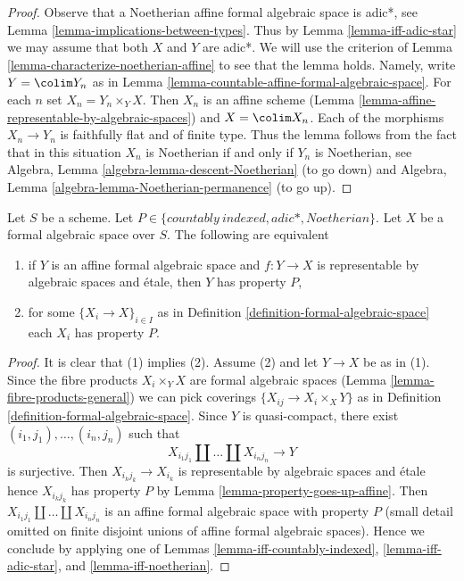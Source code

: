 \begin{proof}
Observe that a Noetherian affine formal algebraic space is adic*, see
Lemma \ref{lemma-implications-between-types}. Thus by
Lemma \ref{lemma-iff-adic-star} we may assume that both $X$ and $Y$
are adic*. We will use the criterion of
Lemma \ref{lemma-characterize-noetherian-affine}
to see that the lemma holds. Namely, write $Y = \colim Y_n$
as in Lemma \ref{lemma-countable-affine-formal-algebraic-space}.
For each $n$ set $X_n = Y_n \times_Y X$. Then $X_n$ is an
affine scheme (Lemma \ref{lemma-affine-representable-by-algebraic-spaces})
and $X = \colim X_n$. Each of the morphisms $X_n \to Y_n$ is
faithfully flat and of finite type. Thus the lemma follows from the
fact that in this situation $X_n$ is Noetherian if and only if $Y_n$
is Noetherian, see
Algebra, Lemma \ref{algebra-lemma-descent-Noetherian} (to go down)
and
Algebra, Lemma \ref{algebra-lemma-Noetherian-permanence} (to go up).
\end{proof}

\begin{lemma}
\label{lemma-type-local}
Let $S$ be a scheme. Let $P \in \{countably\ indexed, adic*, Noetherian\}$.
Let $X$ be a formal algebraic space over $S$.
The following are equivalent
\begin{enumerate}
\item if $Y$ is an affine formal algebraic space and
$f : Y \to X$ is representable by algebraic spaces and \'etale,
then $Y$ has property $P$,
\item for some $\{X_i \to X\}_{i \in I}$ as in
Definition \ref{definition-formal-algebraic-space}
each $X_i$ has property $P$.
\end{enumerate}
\end{lemma}

\begin{proof}
It is clear that (1) implies (2). Assume (2) and let
$Y \to X$ be as in (1). Since the fibre products $X_i \times_Y X$
are formal algebraic spaces (Lemma \ref{lemma-fibre-products-general})
we can pick coverings $\{X_{ij} \to X_i \times_X Y\}$ as in
Definition \ref{definition-formal-algebraic-space}.
Since $Y$ is quasi-compact, there exist
$(i_1, j_1), \ldots, (i_n, j_n)$ such that
$$
X_{i_1 j_1} \amalg \ldots \amalg X_{i_n j_n} \longrightarrow Y
$$
is surjective. Then $X_{i_kj_k} \to X_{i_k}$ is representable
by algebraic spaces and \'etale hence $X_{i_kj_k}$ has property $P$ by
Lemma \ref{lemma-property-goes-up-affine}.
Then $X_{i_1 j_1} \amalg \ldots \amalg X_{i_n j_n}$ is an
affine formal algebraic space with property $P$ (small detail
omitted on finite disjoint unions of affine formal algebraic spaces).
Hence we conclude by applying one of
Lemmas \ref{lemma-iff-countably-indexed},
\ref{lemma-iff-adic-star}, and
\ref{lemma-iff-noetherian}.
\end{proof}

